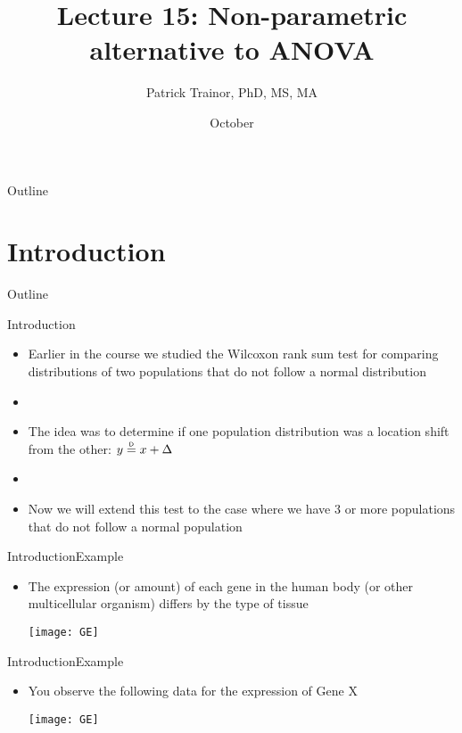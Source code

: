 \documentclass[xcolor=dvipsnames]{beamer}
\title[Lecture 15]{Lecture 15: Non-parametric alternative to ANOVA}
\author[Patrick Trainor]{Patrick Trainor, PhD, MS, MA}
\institute[NMSU]{New Mexico State University}
\date{October}
\newcommand\myeq{\mathrel{\overset{\makebox[0pt]{\mbox{\normalfont\tiny\sffamily D}}}{=}}}
\begin{document}
	
\begin{frame}
	\maketitle
\end{frame}

\begin{frame}{Outline}
	\tableofcontents[hideallsubsections]
\end{frame}

\section{Introduction}

\begin{frame}{Outline}
	\tableofcontents[currentsection,subsectionstyle=show/shaded/hide]
\end{frame}

\begin{frame}{Introduction}
	\begin{itemize}
		\item Earlier in the course we studied the Wilcoxon rank sum test for comparing distributions of two populations that do not follow a normal distribution
		\item[]
		\item The idea was to determine if one population distribution was a location shift from the other: $y \myeq x + \Delta$
		\item[]
		\item Now we will extend this test to the case where we have 3 or more populations that do not follow a normal population
	\end{itemize}
\end{frame}

\begin{frame}{Introduction}{Example}
	\begin{itemize}
		\item The expression (or amount) of each gene in the human body (or other multicellular organism) differs by the type of tissue 
		\begin{center}
			\texttt{[image: GE]}
		\end{center}
	\end{itemize}
\end{frame}

\begin{frame}{Introduction}{Example}
	\begin{itemize}
		\item You observe the following data for the expression of Gene X
		\begin{center}
			\texttt{[image: GE]}
		\end{center}
	\end{itemize}
\end{frame}
\end{document}
